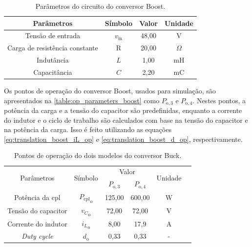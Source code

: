 \vspace{8pt}
\begin{table}[H]
  \centering
  \begin{tabular}{cccc}
    \toprule
    Parâmetros & Símbolo  & Valor & Unidade \\
    \midrule
    Tensão de entrada & $v_{\mathrm{in}}$ & 48,00 & V \\
    Carga de resistência constante & R & 20,00 & $\Omega$ \\
    Indutância & $L$ & 1,00 & mH \\
    Capacitância  & $C$ & 2,20 & mC \\
    \bottomrule
  \end{tabular}
  \caption{Parâmetros do circuito do conversor Boost.}
  \label{table:circuit_parameter_boost}
\end{table}

Os pontos de operação do conversor Boost, usados para simulação, são apresentados na \autoref{table:op_parameters_boost} como $P_{\mathrm{o}, 3}$ e $P_{\mathrm{o}, 4}$. Nestes pontos, a potência da carga e a tensão do capacitor são predefinidas, enquanto a corrente do indutor e o ciclo de trabalho são calculados com base na tensão do capacitor e na potência da carga. Isso é feito utilizando as equações \eqref{eq:translation_boost_iL_op} e \eqref{eq:translation_boost_d_op}, respectivamente.

\vspace{8pt}
\begin{table}[H]
  \centering
  \setlength{\tabcolsep}{10pt}
  \begin{tabular}{cccccc}
    \toprule
    \multirow{2}{*}{\centering Parâmetros} & \multirow{2}{*}{\centering Símbolo} & \multicolumn{2}{c}{\centering Valor} & \multirow{2}{*}{\centering Unidade} \\
    \cmidrule{3-4}
     &  & $P_{\mathrm{o}, 3}$ & $P_{\mathrm{o}, 4}$ &  \\
    \midrule
    Potência da \acrshort{cpl} & ${P_{\mathrm{cpl}}}_{\mathrm{o}}$ & 125,00  & 600,00 & W \\
    Tensão do capacitor & ${v_C}_{\mathrm{o}}$ & 72,00 & 72,00  & V \\
    Corrente do indutor & ${i_L}_{\mathrm{o}}$ & 8,00 & 17,9 & A \\
    \textit{Duty cycle} & $d_{\mathrm{o}}$ & 0,33 & 0,33 & - \\  
    \bottomrule
  \end{tabular}
  \caption{Pontos de operação do dois modelos do conversor Buck.}
  \label{table:op_parameters_boost}
\end{table}

